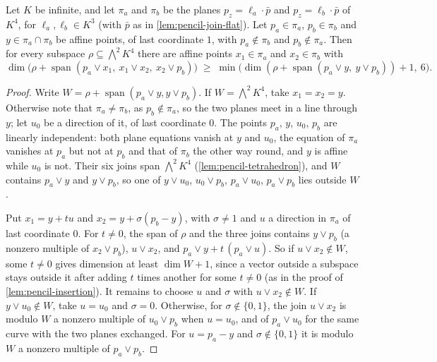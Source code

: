 \begin{lemma}
  \label{lem:pencil-insertion-two}
  \leanok
  Let $K$ be infinite, and let $\pi_a$ and $\pi_b$ be the planes
  $p_z = \ell_a \cdot \bar p$ and $p_z = \ell_b \cdot \bar p$ of $K^4$, for
  $\ell_a, \ell_b \in K^3$ (with $\bar p$ as in \cref{lem:pencil-join-flat}).
  Let $p_a \in \pi_a$, $p_b \in \pi_b$ and $y \in \pi_a \cap \pi_b$ be
  affine points, of last coordinate $1$, with $p_a \notin \pi_b$ and
  $p_b \notin \pi_a$. Then for every subspace $\rho \subseteq \bigwedge^2 K^4$
  there are affine points $x_1 \in \pi_a$ and $x_2 \in \pi_b$ with
  \[
    \dim\bigl(\rho + \operatorname{span}(p_a \vee x_1,\ x_1 \vee x_2,\
      x_2 \vee p_b)\bigr)
    \;\ge\; \min\bigl(\dim(\rho + \operatorname{span}(p_a \vee y,\
      y \vee p_b)) + 1,\ 6\bigr).
  \]
\end{lemma}
\begin{proof}
  \leanok
  Write $W = \rho + \operatorname{span}(p_a \vee y, y \vee p_b)$. If
  $W = \bigwedge^2 K^4$, take $x_1 = x_2 = y$. Otherwise note that
  $\pi_a \neq \pi_b$, as $p_b \notin \pi_a$, so the two planes meet in a
  line through $y$; let $u_0$ be a direction of it, of last coordinate
  $0$. The points $p_a$, $y$, $u_0$, $p_b$ are linearly independent: both
  plane equations vanish at $y$ and $u_0$, the equation of $\pi_a$ vanishes
  at $p_a$ but not at $p_b$ and that of $\pi_b$ the other way round, and
  $y$ is affine while $u_0$ is not. Their six joins span $\bigwedge^2 K^4$
  (\cref{lem:pencil-tetrahedron}), and $W$ contains $p_a \vee y$ and
  $y \vee p_b$, so one of $y \vee u_0$, $u_0 \vee p_b$,
  $p_a \vee u_0$, $p_a \vee p_b$ lies outside $W$.

  Put $x_1 = y + t u$ and $x_2 = y + \sigma (p_b - y)$, with $\sigma \neq 1$
  and $u$ a direction in $\pi_a$ of last coordinate $0$. For $t \neq 0$,
  the span of $\rho$ and the three joins contains $y \vee p_b$ (a nonzero
  multiple of $x_2 \vee p_b$), $u \vee x_2$, and
  $p_a \vee y + t\,(p_a \vee u)$.
  So if $u \vee x_2 \notin W$, some $t \neq 0$ gives dimension at least
  $\dim W + 1$, since a vector outside a subspace stays outside it after
  adding $t$ times another for some $t \neq 0$ (as in the proof of
  \cref{lem:pencil-insertion}). It remains to choose $u$ and $\sigma$ with
  $u \vee x_2 \notin W$. If $y \vee u_0 \notin W$, take $u = u_0$ and
  $\sigma = 0$. Otherwise, for $\sigma \notin \{0, 1\}$, the join
  $u \vee x_2$ is modulo $W$ a nonzero multiple of $u_0 \vee p_b$ when
  $u = u_0$, and of $p_a \vee u_0$ for the same curve with the two planes
  exchanged. For $u = p_a - y$ and $\sigma \notin \{0, 1\}$ it is modulo
  $W$ a nonzero multiple of $p_a \vee p_b$.
\end{proof}

